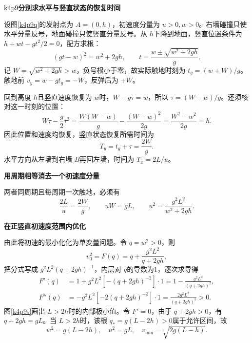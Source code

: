 \begin{drillsolution}{k4p9}\textbf{分别求水平与竖直状态的恢复时间}\par\nobreak
设图\ref{k4p9q}的发射点为 $A=(0,h)$，初速度分量为 $u>0,w>0$。右墙碰撞只使水平分量反号，地面碰撞只使竖直分量反号。从 $h$下降到地面，竖直位置条件为 $h+wt-gt^2/2=0$，配方求根：
\[
 (gt-w)^2=w^2+2gh,\qquad
 t=\frac{w\pm\sqrt{w^2+2gh}}g.
\]
记 $W=\sqrt{w^2+2gh}>w$，负号根小于零，故实际触地时刻为 $t_g=(w+W)/g$。触地前 $v_y=w-gt_g=-W$，反弹后为 $+W$。

回到高度 $h$且竖直速度恢复为 $w$时，$W-g\tau=w$，所以 $\tau=(W-w)/g$。还须核对这一时刻的位置：
\[
 W\tau-\frac g2\tau^2
 =\frac{W(W-w)}g-\frac{(W-w)^2}{2g}
 =\frac{W^2-w^2}{2g}=h.
\]
因此位置和速度均恢复，竖直状态恢复所需时间为
\[T_y=t_g+\tau=\frac{2W}{g}.\]
水平方向从左墙到右墙 $B$再回左墙，时间为 $T_x=2L/u$。



\par\medskip{}\noindent\textbf{用周期相等消去一个初速度分量}\par\nobreak
两者同周期且每周期一次触地，必须有
\[\frac{2L}{u}=\frac{2W}{g},\qquad
uW=gL,\qquad u^2=\frac{g^2L^2}{w^2+2gh}.\]



\par\medskip{}\noindent\textbf{在正竖直初速度范围内优化}\par\nobreak
由此将初速的最小化化为单变量问题。令 $q=w^2>0$，则
\[v_0^2=F(q)=q+\frac{g^2L^2}{q+2gh},\]
把分式写成 $g^2L^2(q+2gh)^{-1}$，内层对 $q$的导数为1，逐次求导得
\begin{align*}
 F'(q)&=1+g^2L^2[-(q+2gh)^{-2}]\cdot1
 =1-\frac{g^2L^2}{(q+2gh)^2},\\
 F''(q)&=-g^2L^2[-2(q+2gh)^{-3}]\cdot1
 =\frac{2g^2L^2}{(q+2gh)^3}>0.
\end{align*}
图\ref{k4p9s}画出 $L>2h$时的内部极小值。令 $F'=0$，由于 $q+2gh>0$，有 $q+2gh=gL$。当 $L>2h$时，该根 $q_*=g(L-2h)>0$属于允许区间，故
\[\boxed{w^2=g(L-2h),\quad u^2=gL,\quad
v_{\min}=\sqrt{2g(L-h)}}.\]




\end{drillsolution}
